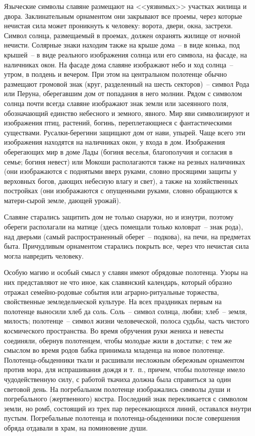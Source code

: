 \documentclass[pscyr,titlepage,chapters]{hedreport}
\begin{document}
  Языческие символы славяне размещают на <<уязвимых>> участках жилища и двора.
  Заклинательным орнаментом они закрывают все проемы, через которые нечистая
  сила может проникнуть к человеку: ворота, двери, окна, застрехи. Символ
  солнца, размещаемый в проемах, должен охранять жилище от ночной нечисти.
  Солярные знаки находим также на крыше дома~-- в виде конька, под крышей~-- в
  виде реального изображения солнца или его символа, на фасаде, на наличниках
  окон. На фасаде дома славяне изображают небо и ход солнца~-- утром, в полдень
  и вечером. При этом на центральном полотенце обычно размещают громовой знак
  (круг, разделенный на шесть секторов)~-- символ Рода или Перуна, оберегавшим
  дом от попадания в него молнии. Рядом с символом солнца почти всегда славяне
  изображают знак земли или засеянного поля, обозначающий единство небесного и
  земного, явного. Мир яви символизируют и изображения птиц, растений, богинь,
  переплетающиеся с фантастическими существами. Русалки-берегини защищают дом от
  нави, упырей. Чаще всего эти изображения находятся на наличниках окон, у входа
  в дом. Изображения оберегающих мир в доме Лады (богиня веселья, благополучия и
  согласия в семье; богиня невест) или Мокоши располагаются также на резных
  наличниках (они изображаются с поднятыми вверх руками, словно просящими защиты
  у верховных богов, дающих небесную влагу и свет), а также на хозяйственных
  постройках (они изображаются с опущенными руками, словно обращаются к
  матери-сырой земле, дающей урожай).
 
  Славяне старались защитить дом не только снаружи, но и изнутри, поэтому
  обереги располагали на матице (здесь помещали только коловрат~-- знак рода),
  над дверьми (самый распространенный оберег~-- подкова), на печи, на предметах
  быта. Причудливым орнаментом старались покрыть все, через что нечистая сила
  могла навредить человеку.

  Особую магию и особый смысл у славян имеют обрядовые полотенца. Узоры на них
  представляют не что иное, как славянский календарь, который образно отражал
  семейно-родовые события или аграрно-ритуальные торжества, свойственные
  земледельческой культуре. На всех праздниках первым на полотенце выносили хлеб
  да соль. Соль~-- символ солнца, любви; хлеб~-- земля, милость; полотенце~--
  символ жизни человеческой, полоса судьбы, часть чистого космического
  пространства. Во время обручения руки жениха и невесты соединяли, обернув
  полотенцем, чтобы молодые жили в достатке; с тем же смыслом во время родов
  бабка принимала младенца на новое полотенце. Полотенца-обыденники ткали и
  расшивали несложным обережным орнаментом против мора, для испрашивания дождя
  и т.~п., причем, чтобы полотенце имело чудодейственную силу, с работой ткачиха
  должна была справиться за один световой день. На погребальном полотенце
  изображались символы души и погребального (жертвенного) костра. Последний знак
  перекликается с символом земли, но ромб, состоящий из трех пар пересекающихся
  линий, оставался внутри пустым. Погребальные полотенца и полотенца-обыденники
  после совершения обряда отдавали в храм, на поминовение души.
\end{document}
